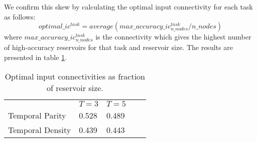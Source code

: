 \begin{figure*}[ht]
    \centering
    \caption{
        Plots of input connectivity against accuracy on TP3. Reservoir sizes $[40..70]$ are omitted for brevity.
        Note that the optimal input connectivity tends slightly to the right of the middle for all reservoir sizes.
        The omitted plots are presented in figures \ref{fig:TP3-IC-1} and \ref{fig:TP3-IC-2} in appendix \ref{app:reservoir_size-input_connectivity}.
        }
    \label{fig:TP3-IC}
    \resizebox{\textwidth}{!}{
        \subfloat[N=10]{
            
        }
        \subfloat[N=80]{
            
        }
    }
    \resizebox{\textwidth}{!}{
        \subfloat[N=20]{
            
        }
        \subfloat[N=90]{
            
        }
    }
    \resizebox{\textwidth}{!}{
        \subfloat[N=30]{
            
        }
        \subfloat[N=100]{
            
        }
    }
\end{figure*}

We confirm this skew by calculating the optimal input connectivity for each task as follows:
\begin{equation} \label{eq:optimal-ic}
optimal\_ic^{task} = average(max\_accuracy\_ic_{n\_nodes}^{task} / n\_nodes)
\end{equation}
where $ max\_accuracy\_ic_{n\_nodes}^{task} $ is the connectivity which gives the highest number of high-accuracy reservoirs for that task and reservoir size.
The results are presented in table \ref{tab:optimal-ic}.

\begin{table}[h]
	\centering
	\caption{Optimal input connectivities as fraction of reservoir size.}
	\label{tab:optimal-ic}
	\begin{tabular}{lllll}
						 & $T=3$  & $T=5$ \\
        Temporal Parity  & 0.528          & 0.489         \\
        Temporal Density & 0.439          & 0.443
	\end{tabular}
\end{table}

